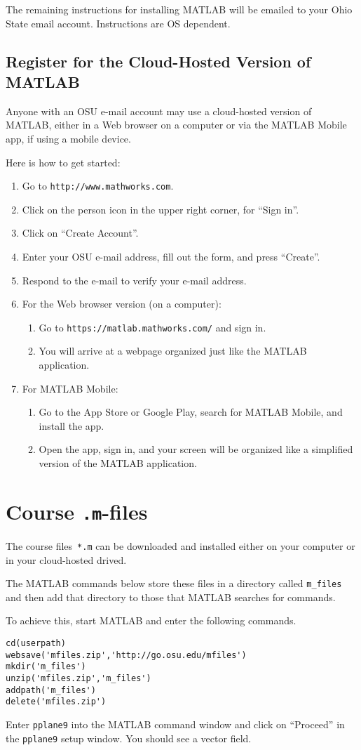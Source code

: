 \documentclass{article}
\begin{document}
The remaining instructions for installing MATLAB will be emailed to
your Ohio State email account. Instructions are OS dependent.

\subsection{Register for the Cloud-Hosted Version of MATLAB}
Anyone with an OSU e-mail account may use a cloud-hosted version of MATLAB, either in a Web browser on a computer or via the MATLAB Mobile app, if using a mobile device. 

Here is how to get started: 

\begin{enumerate}
\def\labelenumi{\arabic{enumi})}
\item Go to  \verb|http://www.mathworks.com|.
\item Click on the person icon in the upper right corner, for ``Sign in''.
\item Click on ``Create Account''.
\item Enter your OSU e-mail address, fill out the form, and press ``Create''.
\item Respond to the e-mail to verify your e-mail address.
\item For the Web browser version (on a computer): 
\begin{enumerate}
\item Go to \verb|https://matlab.mathworks.com/| and sign in.
\item You will arrive at a webpage organized just like the MATLAB application.
\end{enumerate}
\item For MATLAB Mobile: 
\begin{enumerate}
\item Go to the App Store or Google Play, search for MATLAB Mobile, and install the app.  
\item Open the app, sign in, and your screen will be organized like a simplified version of the MATLAB application.
\end{enumerate}
\end{enumerate}

\section{Course \texttt{.m}-files}

The course files~\verb|*.m| can be downloaded and installed either on your computer or in your cloud-hosted drived.
  
The MATLAB commands below store these files in a directory called
  \verb|m_files| and then add that directory to those that MATLAB searches for commands.
  
  To achieve this, start MATLAB and enter the following
  commands.

\begin{verbatim}  
cd(userpath)
websave('mfiles.zip','http://go.osu.edu/mfiles')
mkdir('m_files')
unzip('mfiles.zip','m_files')
addpath('m_files')
delete('mfiles.zip')
\end{verbatim}

Enter \verb|pplane9| into the MATLAB command window and
click on ``Proceed'' in the \verb|pplane9| setup window.  You should
see a vector field.
\end{document}
